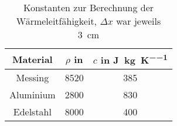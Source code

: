 \begin{table}[h!]
\begin{center}
\begin{tabular}{c | c | c}
	Material & $\rho$ in \si{\kilo\gram\per\metre\cubic} & $c$ in \si{\joule\per\kilo\gram\per\kelvin} \\
\hline
	Messing & 8520 & 385 \\
	Aluminium & 2800 & 830 \\
	Edelstahl & 8000 & 400
\end{tabular}
\end{center}
\caption{Konstanten zur Berechnung der Wärmeleitfähigkeit, $\Delta x$ war jeweils \SI{3}{\centi\metre}}
\label{Konstanten}
\end{table}